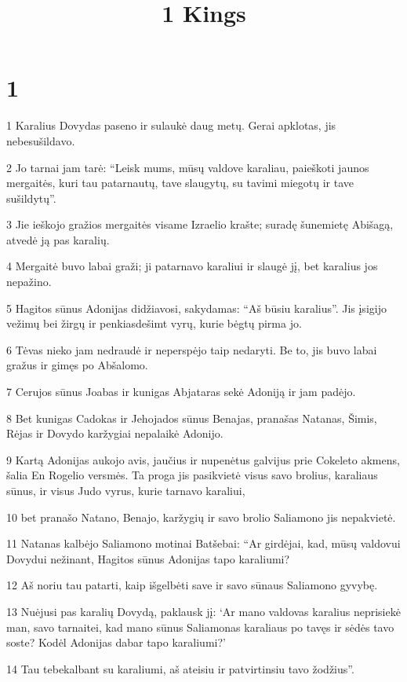 

\title{
\par 1 Kings}

\chapter{1}

\par 1 Karalius Dovydas paseno ir sulaukė daug metų. Gerai apklotas, jis nebesušildavo. 
\par 2 Jo tarnai jam tarė: “Leisk mums, mūsų valdove karaliau, paieškoti jaunos mergaitės, kuri tau patarnautų, tave slaugytų, su tavimi miegotų ir tave sušildytų”. 
\par 3 Jie ieškojo gražios mergaitės visame Izraelio krašte; suradę šunemietę Abišagą, atvedė ją pas karalių. 
\par 4 Mergaitė buvo labai graži; ji patarnavo karaliui ir slaugė jį, bet karalius jos nepažino. 
\par 5 Hagitos sūnus Adonijas didžiavosi, sakydamas: “Aš būsiu karalius”. Jis įsigijo vežimų bei žirgų ir penkiasdešimt vyrų, kurie bėgtų pirma jo. 
\par 6 Tėvas nieko jam nedraudė ir neperspėjo taip nedaryti. Be to, jis buvo labai gražus ir gimęs po Abšalomo. 
\par 7 Cerujos sūnus Joabas ir kunigas Abjataras sekė Adoniją ir jam padėjo. 
\par 8 Bet kunigas Cadokas ir Jehojados sūnus Benajas, pranašas Natanas, Šimis, Rėjas ir Dovydo karžygiai nepalaikė Adonijo. 
\par 9 Kartą Adonijas aukojo avis, jaučius ir nupenėtus galvijus prie Cokeleto akmens, šalia En Rogelio versmės. Ta proga jis pasikvietė visus savo brolius, karaliaus sūnus, ir visus Judo vyrus, kurie tarnavo karaliui, 
\par 10 bet pranašo Natano, Benajo, karžygių ir savo brolio Saliamono jis nepakvietė. 
\par 11 Natanas kalbėjo Saliamono motinai Batšebai: “Ar girdėjai, kad, mūsų valdovui Dovydui nežinant, Hagitos sūnus Adonijas tapo karaliumi? 
\par 12 Aš noriu tau patarti, kaip išgelbėti save ir savo sūnaus Saliamono gyvybę. 
\par 13 Nuėjusi pas karalių Dovydą, paklausk jį: ‘Ar mano valdovas karalius neprisiekė man, savo tarnaitei, kad mano sūnus Saliamonas karaliaus po tavęs ir sėdės tavo soste? Kodėl Adonijas dabar tapo karaliumi?’ 
\par 14 Tau tebekalbant su karaliumi, aš ateisiu ir patvirtinsiu tavo žodžius”. 
